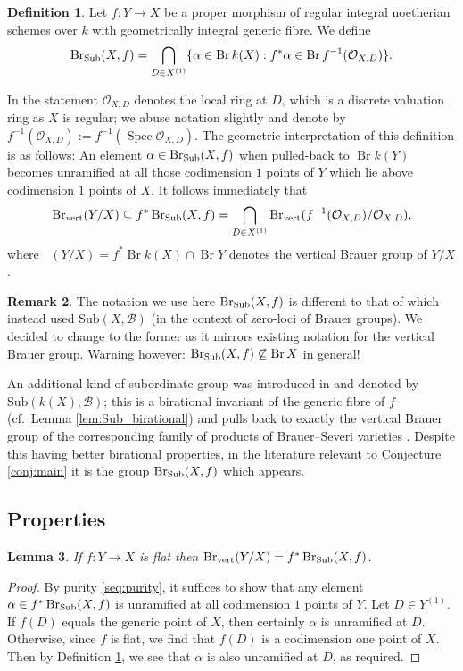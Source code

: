 \documentclass[a4paper,12pt,reqno]{amsart}
\numberwithin{equation}{section} \numberwithin{figure}{section}
\DeclareMathOperator{\Spec}{Spec}
\DeclareMathOperator{\Br}{Br} \DeclareMathOperator{\Brnr}{Br_{nr}}
\DeclareMathOperator{\BrV}{Br_{vert}}
\renewcommand{\O}{\mathcal{O}}
\newcommand{\br}{\mathscr{B}}
\renewcommand{\#}{\sharp}
\newtheorem{lemma}{Lemma}
\theoremstyle{definition}
\newtheorem{definition}[lemma]{Definition}
\newtheorem{remark}[lemma]{Remark}
\numberwithin{lemma}{section}
\begin{document}
\begin{definition} \label{def:Sub}
	Let $f: Y \to X$ be a proper morphism of regular integral noetherian schemes over $k$
	with geometrically integral generic fibre. We define
	$$\Sub(X,f) = \bigcap_{D \in X^{(1)}} \{ \alpha \in \Br k(X) : f^* \alpha \in \Br f^{-1}(\O_{X,D})\}.$$
\end{definition}
 In the statement $\O_{X,D}$ denotes the local ring at $D$, which is a discrete valuation ring as $X$ is regular; we abuse notation slightly and denote by $f^{-1}(\O_{X,D}) :=f^{-1}(\Spec \O_{X,D})$. The geometric interpretation of this definition is as follows: An element $\alpha \in \operatorname{Br_{\mathrm{Sub}}}(X,f)$ when pulled-back to $\Br k(Y)$ becomes unramified at all those codimension $1$ points of $Y$ which lie above codimension $1$ points of $X$. It follows immediately that 
\begin{equation} \label{lem:Vert}
	\BrV(Y/X) \subseteq 
	f^*\Sub(X,f) = \bigcap_{D \in X^{(1)}} \BrV(f^{-1}(\O_{X,D})/\O_{X,D}),
\end{equation}
where  $\BrV(Y/X) = f^* \Br k(X) \cap \Br Y$ denotes the vertical Brauer group of $Y/X$.

\begin{remark}
	The notation we use here $\operatorname{Br_{\mathrm{Sub}}}(X,f)$ is different to that of \cite[\S 2.6]{Lou18}
	which instead used $\mathrm{Sub}(X,\br)$ (in the context of zero-loci
	of Brauer groups). We decided to change to the former
	as it mirrors existing notation for the vertical Brauer
	group. Warning however: $\Sub(X,f) \not \subseteq \Br X$ in general!
	
	An additional kind of subordinate group was introduced in \cite[\S 2.6]{Lou18}
	and denoted by $\mathrm{Sub}(k(X),\br)$; this is a birational invariant
	of the generic fibre of $f$ (cf.~Lemma \ref{lem:Sub_birational})
	and pulls back to exactly the vertical Brauer
	group of the corresponding family of products of Brauer--Severi varieties 
	\cite[Thm.~2.11]{Lou18}. Despite this having better birational properties,
	in the literature relevant to Conjecture \ref{conj:main}
	it is the group $\operatorname{Br_{\mathrm{Sub}}}(X,f)$ which appears.
\end{remark}

\subsection{Properties}


\begin{lemma} \label{lem:flat}
	If $f: Y \to X$ is flat then $\BrV(Y/X) = f^*\Sub(X,f)$.
\end{lemma}
\begin{proof}
	By purity \eqref{seq:purity}, it suffices to show that any element 
	$\alpha \in f^*\operatorname{Br_{\mathrm{Sub}}}(X,f)$ is unramified at all
	codimension $1$ points of $Y$. Let $D \in Y^{(1)}$. If $f(D)$ equals the generic
	point of $X$, then certainly $\alpha$ is unramified at $D$. Otherwise, since $f$ is flat,
	we find that $f(D)$ is a codimension one point of $X$. Then by Definition \ref{def:Sub},
	we see that $\alpha$ is also unramified at $D$, as required.
\end{proof}
\end{document}
